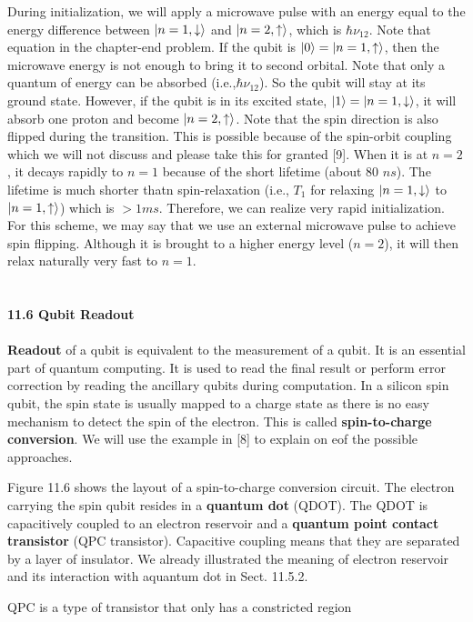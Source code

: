 \documentclass{article}
\begin{document}
During initialization, we will apply a microwave pulse with an energy equal to
the energy difference between $\ket{n=1,\downarrow}$ and $\ket{n=2,\uparrow}$, which is $\hbar \nu_{12}$.
Note that equation in the chapter-end problem. If the qubit is $\ket{0}
=\ket{n=1,\uparrow}$, then the microwave energy is not enough to bring it to 
second orbital. Note that only a quantum of energy can be absorbed (i.e.,$\hbar \nu_{12}$).
So the qubit will stay at its ground state. However, if the qubit is in its excited state, $\ket{1}=\ket{n=1,\downarrow}$,
it will absorb one proton and become $\ket{n=2,\uparrow}$. Note that the spin direction is also flipped 
during the transition. This is possible because of the spin-orbit coupling which we will not
discuss and please take this for granted [9]. When it is at $n=2$, it decays rapidly to $n=1$ because of the
short lifetime (about 80 $ns$). The lifetime is much shorter thatn spin-relaxation (i.e., $T_1$ for relaxing
$\ket{n=1,\downarrow}$ to $\ket{n=1,\uparrow}$) which is $>1 ms$. Therefore, we can realize very rapid initialization.
For this scheme, we may say that we use an external microwave pulse to achieve spin flipping. Although
it is brought to a higher energy level ($n=2$), it will then relax naturally very fast to $n=1$.\\\\\\
\textbf{\large 11.6 Qubit Readout}\\\\
\textbf{Readout} of a qubit is equivalent to the measurement of a qubit. It is an essential part of
quantum computing. It is used to read the final result or perform error correction by reading the ancillary qubits
during computation. In a silicon spin qubit, the spin state is usually mapped to a charge state as there is no easy
mechanism to detect the spin of the electron. This is called \textbf{spin-to-charge conversion}. We will use the
example in [8] to explain on eof the possible approaches.

Figure 11.6 shows the layout of a spin-to-charge conversion circuit. The electron carrying the spin qubit resides in a
\textbf{quantum dot} (QDOT). The QDOT is capacitively coupled to an electron reservoir and a \textbf{quantum point contact transistor}
(QPC transistor). Capacitive coupling means that they are separated by a layer of insulator. We already illustrated the meaning of electron
reservoir and its interaction with aquantum dot in Sect. 11.5.2.

QPC is a type of transistor that only has a constricted region
\end{document}
